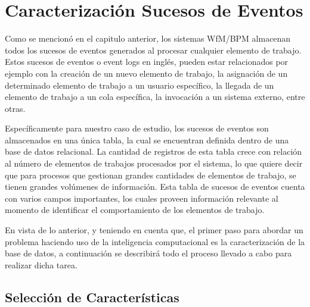 
\chapter{Caracterización Sucesos de Eventos}

\ifpdf
    \graphicspath{{Chapter2/Figs/Raster/}{Chapter2/Figs/PDF/}{Chapter2/Figs/}}
\else
    \graphicspath{{Chapter2/Figs/Vector/}{Chapter2/Figs/}}
\fi

Como se mencionó en el capitulo anterior, los sistemas WfM/BPM almacenan todos los sucesos de eventos generados al procesar cualquier elemento de trabajo. Estos sucesos de eventos o event logs en inglés, pueden estar relacionados por ejemplo con la creación de un nuevo elemento de trabajo, la asignación de un determinado elemento de trabajo a un usuario específico, la llegada de un elemento de trabajo a un cola específica, la invocación a un sistema externo, entre otras.

Específicamente para nuestro caso de estudio, los sucesos de eventos son almacenados en una única tabla, la cual se encuentran definida dentro de una base de datos relacional. La cantidad de registros de esta tabla crece con relación al número de elementos de trabajos procesados por el sistema, lo que quiere decir que para procesos que gestionan grandes cantidades de elementos de trabajo, se tienen grandes volúmenes de información. Esta tabla de sucesos de eventos cuenta con varios campos importantes, los cuales proveen información relevante al momento de identificar el comportamiento de los elementos de trabajo.

En vista de lo anterior, y teniendo en cuenta que, el primer paso para abordar un problema haciendo uso de la inteligencia computacional es la caracterización de la base de datos, a continuación se describirá todo el proceso llevado a cabo para realizar dicha tarea.

\section{Selección de Características} %
\label{section2.1}

